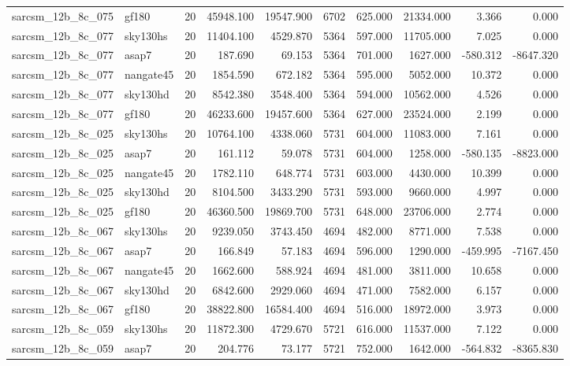 \documentclass{article}
\begin{document}
\begin{longtable}{llrrrrrrrr}
sarcsm\_12b\_8c\_075 & gf180 & 20 & 45948.100 & 19547.900 & 6702 & 625.000 & 21334.000 & 3.366 & 0.000 \\
sarcsm\_12b\_8c\_077 & sky130hs & 20 & 11404.100 & 4529.870 & 5364 & 597.000 & 11705.000 & 7.025 & 0.000 \\
sarcsm\_12b\_8c\_077 & asap7 & 20 & 187.690 & 69.153 & 5364 & 701.000 & 1627.000 & -580.312 & -8647.320 \\
sarcsm\_12b\_8c\_077 & nangate45 & 20 & 1854.590 & 672.182 & 5364 & 595.000 & 5052.000 & 10.372 & 0.000 \\
sarcsm\_12b\_8c\_077 & sky130hd & 20 & 8542.380 & 3548.400 & 5364 & 594.000 & 10562.000 & 4.526 & 0.000 \\
sarcsm\_12b\_8c\_077 & gf180 & 20 & 46233.600 & 19457.600 & 5364 & 627.000 & 23524.000 & 2.199 & 0.000 \\
sarcsm\_12b\_8c\_025 & sky130hs & 20 & 10764.100 & 4338.060 & 5731 & 604.000 & 11083.000 & 7.161 & 0.000 \\
sarcsm\_12b\_8c\_025 & asap7 & 20 & 161.112 & 59.078 & 5731 & 604.000 & 1258.000 & -580.135 & -8823.000 \\
sarcsm\_12b\_8c\_025 & nangate45 & 20 & 1782.110 & 648.774 & 5731 & 603.000 & 4430.000 & 10.399 & 0.000 \\
sarcsm\_12b\_8c\_025 & sky130hd & 20 & 8104.500 & 3433.290 & 5731 & 593.000 & 9660.000 & 4.997 & 0.000 \\
sarcsm\_12b\_8c\_025 & gf180 & 20 & 46360.500 & 19869.700 & 5731 & 648.000 & 23706.000 & 2.774 & 0.000 \\
sarcsm\_12b\_8c\_067 & sky130hs & 20 & 9239.050 & 3743.450 & 4694 & 482.000 & 8771.000 & 7.538 & 0.000 \\
sarcsm\_12b\_8c\_067 & asap7 & 20 & 166.849 & 57.183 & 4694 & 596.000 & 1290.000 & -459.995 & -7167.450 \\
sarcsm\_12b\_8c\_067 & nangate45 & 20 & 1662.600 & 588.924 & 4694 & 481.000 & 3811.000 & 10.658 & 0.000 \\
sarcsm\_12b\_8c\_067 & sky130hd & 20 & 6842.600 & 2929.060 & 4694 & 471.000 & 7582.000 & 6.157 & 0.000 \\
sarcsm\_12b\_8c\_067 & gf180 & 20 & 38822.800 & 16584.400 & 4694 & 516.000 & 18972.000 & 3.973 & 0.000 \\
sarcsm\_12b\_8c\_059 & sky130hs & 20 & 11872.300 & 4729.670 & 5721 & 616.000 & 11537.000 & 7.122 & 0.000 \\
sarcsm\_12b\_8c\_059 & asap7 & 20 & 204.776 & 73.177 & 5721 & 752.000 & 1642.000 & -564.832 & -8365.830 \\

\end{longtable}
\end{document}
